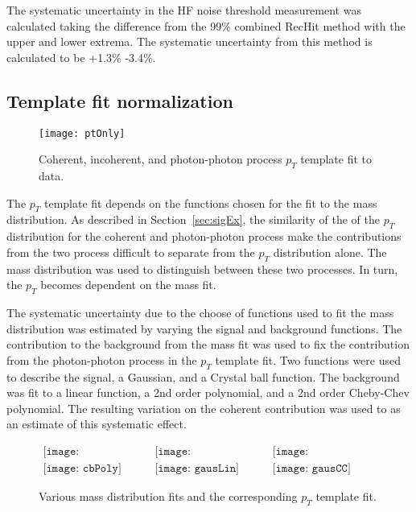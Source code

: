       The systematic uncertainty in the HF noise threshold measurement was 
        calculated taking the difference from the 99\% combined RecHit method
        with the upper and lower extrema. 
      The systematic uncertainty from this method is calculated to be +1.3\% 
        -3.4\%.


    \subsection{Template fit normalization}
      \begin{figure}[!Hhtb]
        \centering
        \texttt{[image: ptOnly]}
        \caption{Coherent, incoherent, and photon-photon process $p_{T}$ template fit to data.}
        \label{fig:ptTempFit}
      \end{figure}

      The $p_{T}$ template fit depends on the functions chosen for the fit
        to the mass distribution.
      As described in Section~\ref{sec:sigEx}, the similarity of the of the 
        $p_{T}$ distribution for the coherent and photon-photon process make
        the contributions from the two process difficult to separate from the 
        $p_{T}$ distribution alone.
      The mass distribution was used to distinguish between these two processes.
      In turn, the $p_{T}$ becomes dependent on the mass fit. 

      The systematic uncertainty due to the choose of functions used to fit
        the mass distribution was estimated by varying the signal and 
        background functions.
      The contribution to the background from the mass fit was used to fix the
        contribution from the photon-photon process in the $p_{T}$ template
        fit.
      Two functions were used to describe the signal, a Gaussian, and a Crystal
        ball function. 
      The background was fit to a linear function, a 2nd order polynomial, and
        a 2nd order Cheby-Chev polynomial. 
      The resulting variation on the coherent contribution was used to as an
        estimate of this systematic effect. 

      \begin{figure}[!Hhbt]
        \centering
        $ \begin{array}{ccc}
          \texttt{[image: cbPolyBkgEst]} &
          \texttt{[image: gausLinBkgEst]} &
          \texttt{[image: gausCCBkgEst]} \\
          \texttt{[image: cbPoly]} &
          \texttt{[image: gausLin]} &
          \texttt{[image: gausCC]}
        \end{array} $
        \caption{Various mass distribution fits and the corresponding $p_{T}$
          template fit.}
        \label{fig:massPtFitsForSyst}
      \end{figure}

